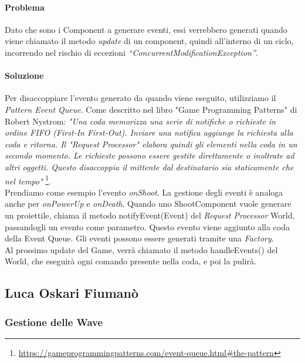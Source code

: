 \documentclass[a4paper,12pt]{report}
\begin{document}
\paragraph{Problema} Dato che sono i Component a generare eventi, essi verrebbero generati quando viene chiamato il metodo \textit{update} di un component, quindi all’interno di un ciclo, incorrendo nel rischio di eccezioni \textit{“ConcurrentModificationException”}.

\paragraph{Soluzione} Per disaccoppiare l'evento generato da quando viene eseguito, utilizziamo il \textit{Pattern Event Queue}. 
Come descritto nel libro "Game Programming Patterns" di Robert Nystrom: \textit{"Una coda memorizza una serie di notifiche o richieste in ordine FIFO (First-In First-Out). 
Inviare una notifica aggiunge la richiesta alla coda e ritorna. Il "Request Processor" elabora quindi gli elementi nella coda in un secondo momento. 
Le richieste possono essere gestite direttamente o inoltrate ad altri oggetti. Questo disaccoppia il mittente dal destinatario sia staticamente che nel tempo"}
\footnote{\url{https://gameprogrammingpatterns.com/event-queue.html\#the-pattern}}.
\\
Prendiamo come esempio l'evento \textit{onShoot}. La gestione degli eventi è analoga anche per \textit{onPowerUp} e \textit{onDeath}. Quando uno ShootComponent vuole generare un proiettile, chiama il metodo notifyEvent(Event) del \textit{Request Processor} World, 
passandogli un evento come parametro. Questo evento viene aggiunto alla coda della Event Queue. Gli eventi possono essere generati tramite una \textit{Factory}.
\\
Al prossimo update del Game, verrà chiamato il metodo handleEvents() del World, che eseguirà ogni comando presente nella coda, e poi la pulirà.
\subsection*{Luca Oskari Fiumanò}

\subsubsection{Gestione delle Wave}
\end{document}
